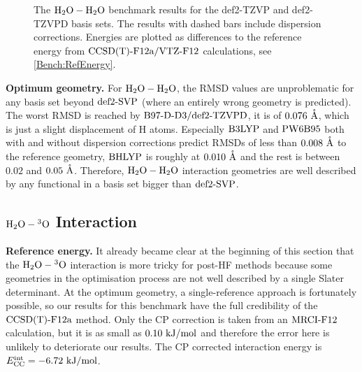 \documentclass[8.5pt,twoside,twocolumn]{article}
\renewcommand{\Ang}{\mathring{\te{A}}}
\newcommand\kmo{\enmat{\te {kJ/mol}}}
\theoremstyle{standard}
\begin{document}
\begin{figure}[h]
\caption{The $\mbox{\ensuremath{\text H _2 \text O-\text H _2 \text O}}$ benchmark results for the def2-TZVP and def2-TZVPD basis sets.
The results with dashed bars include dispersion corrections. Energies are plotted as differences
to the reference energy from $\text{CCSD(T)-F12a}/\text{VTZ-F}12$ calculations, see \eqref{Bench:RefEnergy}.}
\label{Fig:Bench:H2O+H2O:TZVPCompare}
\end{figure}

\textbf{Optimum geometry.} For $\mbox{\ensuremath{\text H _2 \text O-\text H _2 \text O}}$, the RMSD values are 
unproblematic for any basis set beyond $\text{def2-SVP}$ (where an entirely wrong geometry is predicted). The worst RMSD is
reached by $\text{B97-D}\text{-D3}/\text{def2-TZVPD}$, it is of \mbox{$0.076\ \Ang$}, which is just a
slight displacement of H atoms. Especially $\text{B3LYP}$ and $\text{PW6B95}$ both with and
without dispersion corrections predict RMSDs of less than $0.008\ \Ang$ to the
reference geometry, $\text{BHLYP}$ is roughly at $0.010\ \Ang$ and the rest is
between $0.02$ and $0.05\ \Ang$. Therefore, $\mbox{\ensuremath{\text H _2 \text O-\text H _2 \text O}}$ interaction geometries
are well described by any functional in a basis set bigger than $\text{def2-SVP}$.


\subsection{$\mbox{\ensuremath{\text H _2 \text O-\hspace{.2pt} ^3\text{O}}}$ Interaction}

\textbf{Reference energy.} It already became clear at the beginning of this
section that the $\mbox{\ensuremath{\text H _2 \text O-\hspace{.2pt} ^3\text{O}}}$ interaction is more tricky for post-HF methods because
some geometries in the optimisation process are not well described by a single
Slater determinant. At the optimum geometry, a single-reference approach is
fortunately possible, so our results for this benchmark have the full
credibility of the $\text{CCSD(T)-F12a}$ method. Only the CP correction is taken from an
$\text{MRCI-F12}$ calculation, but it is as small as \mbox{$0.10\ \kmo$} and therefore
the error here is unlikely to deteriorate our results. The CP corrected
interaction energy is \mbox{$\ecc=-6.72\ \kmo$}.
\end{document}
